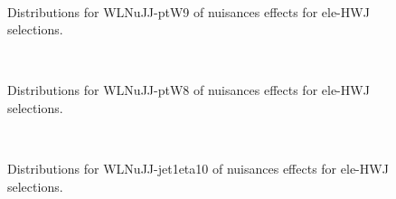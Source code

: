 \begin{figure}[htbp]  
\centering 
\\ 
\caption{ 
   Distributions for WLNuJJ-ptW9 of nuisances effects for ele-HWJ selections.
} 
\label{fig:WLNuJJ_ptW9_ele_HWJ} 
\end{figure} 




\begin{figure}[htbp]  
\centering 
\\ 
\caption{ 
   Distributions for WLNuJJ-ptW8 of nuisances effects for ele-HWJ selections.
} 
\label{fig:WLNuJJ_ptW8_ele_HWJ} 
\end{figure} 




\begin{figure}[htbp]  
\centering 
\\ 
\caption{ 
   Distributions for WLNuJJ-jet1eta10 of nuisances effects for ele-HWJ selections.
} 
\label{fig:WLNuJJ_jet1eta10_ele_HWJ} 
\end{figure} 




